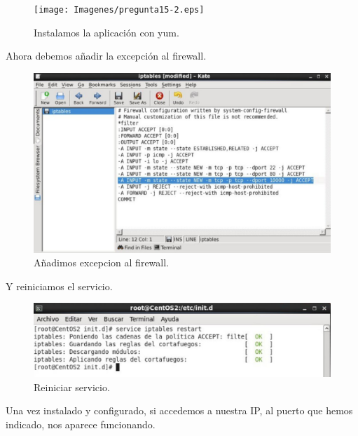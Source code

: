 \begin{figure}[H]
\begin{center}
\texttt{[image: Imagenes/pregunta15-2.eps]}
\caption{Instalamos la aplicación con yum.}
\end{center}
\end{figure}

Ahora debemos añadir la excepción al firewall.

\begin{figure}[H]
\begin{center}
\includegraphics[scale=0.3]{Imagenes/pregunta15-3.eps}
\caption{Añadimos excepcion al firewall.}
\end{center}
\end{figure}

Y reiniciamos el servicio.

\begin{figure}[H]
\begin{center}
\includegraphics[scale=0.4]{Imagenes/pregunta15-4.eps}
\caption{Reiniciar servicio.}
\end{center}
\end{figure}

Una vez instalado y configurado, si accedemos a nuestra IP, al puerto que hemos indicado, nos aparece funcionando.

